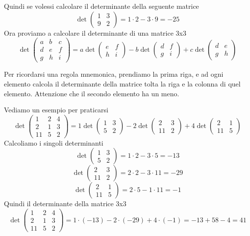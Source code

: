 \documentclass{rapport}
\begin{document}
 Quindi se volessi calcolare il determinante della seguente matrice 
 \[
 \det\begin{pmatrix}
  1 & 3 \\
  9 & 2
 \end{pmatrix} = 1\cdot 2-3\cdot 9 = -25
 \]
Ora proviamo a calcolare il determinante di una matrice 3x3
\[
 \det\begin{pmatrix}
  a & b & c \\
  d & e &f \\
  g & h & i
 \end{pmatrix} = a\det\begin{pmatrix}
  e &f \\
  h & i
 \end{pmatrix} - b \det\begin{pmatrix}
 d  &f \\
  g  & i
 \end{pmatrix} + c\det\begin{pmatrix}
  d & e  \\
  g & h 
 \end{pmatrix}
 \]

 Per ricordarsi una regola mnemonica, prendiamo la prima riga, e ad ogni elemento calcola il determinante della matrice tolta la riga e la colonna di quel elemento.  Attenzione che il secondo elemento ha un meno. 

 Vediamo un esempio per praticarsi
\[
 \det\begin{pmatrix}
  1 & 2 & 4 \\
  2 & 1 &3 \\
  11 & 5 & 2
 \end{pmatrix} = 1\det\begin{pmatrix}
  1 &3 \\
  5 & 2
 \end{pmatrix} - 2 \det\begin{pmatrix}
 2  &3 \\
  11  & 2
 \end{pmatrix} + 4\det\begin{pmatrix}
  2 & 1  \\
  11 & 5 
 \end{pmatrix}
 \]
 Calcoliamo i singoli determinanti 
 \[
 \det\begin{pmatrix}
  1 &3 \\
  5 & 2
 \end{pmatrix} = 1\cdot 2 - 3\cdot 5 = -13
 \]
 \[
 \det\begin{pmatrix}
 2  &3 \\
  11  & 2
 \end{pmatrix} = 2\cdot2 - 3\cdot 11  = -29
 \]
\[
\det\begin{pmatrix}
  2 & 1  \\
  11 & 5 
 \end{pmatrix} = 2\cdot 5 - 1\cdot 11 = -1
\]
Quindi il determinante della matrice 3x3 
\[
 \det\begin{pmatrix}
  1 & 2 & 4 \\
  2 & 1 &3 \\
  11 & 5 & 2
 \end{pmatrix} = 1\cdot (-13) -2 \cdot(-29) +4 \cdot (-1) = -13 +58 -4 = 41
\]
\end{document}
